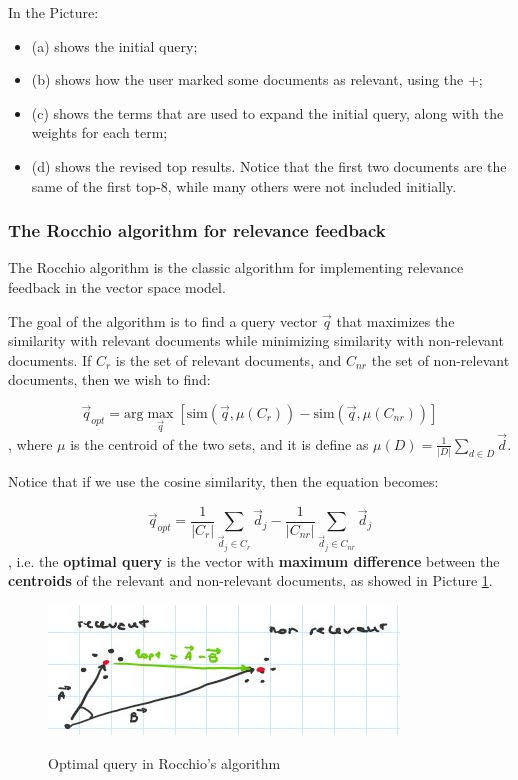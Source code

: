 In the Picture:

\begin{itemize}
    \item (a) shows the initial query;
    \item (b) shows how the user marked some documents as relevant, using the +;
    \item (c) shows the terms that are used to expand the initial query, along with the weights for each term;
    \item (d) shows the revised top results. Notice that the first two documents are the same of the first top-8, while many others were not included initially.
\end{itemize}

\subsubsection{The Rocchio algorithm for relevance feedback}
The Rocchio algorithm is the classic algorithm for implementing relevance feedback in the vector space model. 

The goal of the algorithm is to find a query vector $\Vec{q}$ that maximizes the similarity with relevant documents while minimizing similarity with non-relevant documents. If $C_r$ is the set of relevant documents, and $C_{nr}$ the set of non-relevant documents, then we wish to find:

$$
\Vec{q}_{opt} = \text{arg} \max_{\Vec{q}} [\text{sim}(\Vec{q}, \mu(C_r)) - \text{sim} (\Vec{q}, \mu(C_{nr}))]
$$
, where $\mu$ is the centroid of the two sets, and it is define as $\mu(D) = \frac{1}{|D|} \sum_{d \in D} \Vec{d}$. 

Notice that if we use the cosine similarity, then the equation becomes:

$$
\Vec{q}_{opt} = \frac{1}{|C_r|} \sum_{\Vec{d}_j \in C_r} \Vec{d}_j - \frac{1}{|C_{nr}|} \sum_{\Vec{d}_j \in C_{nr}} \Vec{d}_j
$$
, i.e. the \textbf{optimal query} is the vector with \textbf{maximum difference} between the \textbf{centroids} of the relevant and non-relevant documents, as showed in Picture \ref{rocchio0}.

\begin{figure}[h!]
		\centering
		\includegraphics[scale = 2.0]{img/rocchio0.jpg}
		\label{rocchio0}
        \caption{Optimal query in Rocchio's algorithm}
\end{figure}


